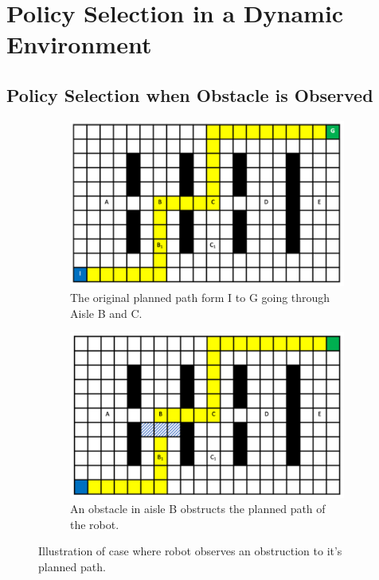 \documentclass[a4paper,12pt]{article}
\begin{document}
	\pagebreak
	\tableofcontents
	\pagebreak
	
	\section{Policy Selection in a Dynamic Environment}
	\label{sec:policySelectionInADynamicEnvironment}
	
		\subsection{Policy Selection when Obstacle is Observed}
		\label{sec:policySelectionWhenObstacleIsObserved}
		
			\begin{figure}[H]
				\centering
				\begin{subfigure}{.4\textwidth}
					\centering
					\includegraphics[width=\linewidth]{originalPlannedPath.png}
					\caption{The original planned path form I to G going through Aisle B and C.}
					\label{fig:originalPlannedPath}
				\end{subfigure}
				\begin{subfigure}{.4\textwidth}
					\centering
					\includegraphics[width=\linewidth]{blockedAisleB.png}
					\caption{An obstacle in aisle B obstructs the planned path of the robot.}
					\label{fig:blockedAisleB}
				\end{subfigure}
				\caption{Illustration of case where robot observes an obstruction to it's planned path.}
				\label{fig:task1_1Figures}
			\end{figure}
			
\end{document}
